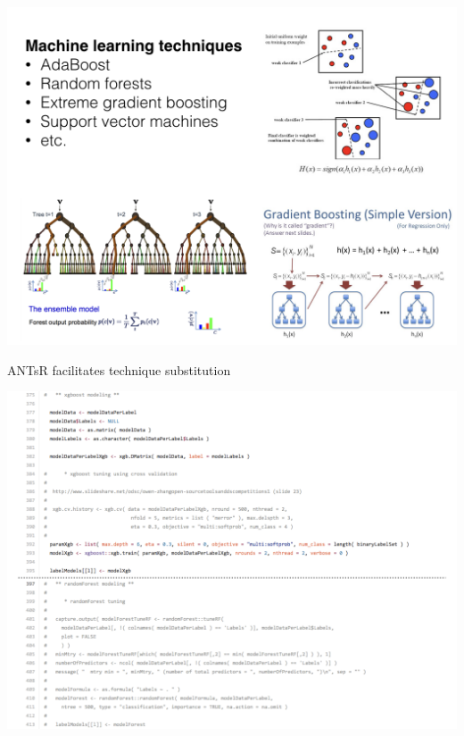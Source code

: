 \documentclass[ignorenonframetext,]{beamer}
\begin{document}
\begin{frame}{}

\centering
\includegraphics[width=0.85 \textwidth]{../Figures/machineLearningTechniques.png}

\end{frame}

\begin{frame}{ANTsR facilitates technique substitution}

\centering
\includegraphics[width=0.85 \textwidth]{../Figures/segRefinement.png}

\end{frame}
\end{document}
